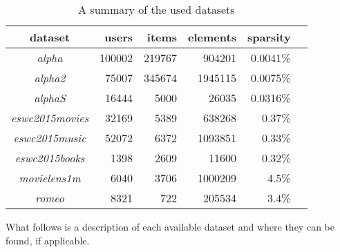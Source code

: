\begin{table}[h]
    \centering
    \begin{tabular}{| c | r | r | r | r | l |}
        \hline
        \textbf{dataset}        & \textbf{users}    & \textbf{items}    & \textbf{elements} & \textbf{sparsity}  \\ \hline

        \textit{alpha}          &   100002          & 219767            & 904201            & 0.0041\%           \\ \hline
        \textit{alpha2}         &   75007           & 345674            & 1945115           & 0.0075\%           \\ \hline
        \textit{alphaS}         &   16444           & 5000              & 26035             & 0.0316\%           \\ \hline
        \textit{eswc2015movies} &   32169           & 5389              & 638268            & 0.37\%             \\ \hline
        \textit{eswc2015music}  &   52072           & 6372              & 1093851           & 0.33\%             \\ \hline
        \textit{eswc2015books}  &   1398            & 2609              & 11600             & 0.32\%             \\ \hline
        \textit{movielens1m}    &   6040            & 3706              & 1000209           & 4.5\%              \\ \hline
        \textit{romeo}          &   8321            & 722               & 205534            & 3.4\%              \\ \hline

    \end{tabular}
    \caption{A summary of the used datasets}
    \label{tab:datasets}
\end{table}

\FloatBarrier

What follows is a description of each available dataset and where they can be found, if applicable.

